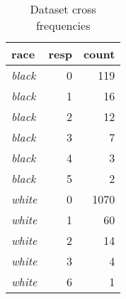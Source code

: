 \begin{table}[H]

\caption{\label{tab:dataset_crosscount}Dataset cross frequencies}
\centering
\begin{tabular}[t]{>{}l|r|r}
\hline
race & resp & count\\
\hline
\em{black} & 0 & 119\\
\hline
\em{black} & 1 & 16\\
\hline
\em{black} & 2 & 12\\
\hline
\em{black} & 3 & 7\\
\hline
\em{black} & 4 & 3\\
\hline
\em{black} & 5 & 2\\
\hline
\em{white} & 0 & 1070\\
\hline
\em{white} & 1 & 60\\
\hline
\em{white} & 2 & 14\\
\hline
\em{white} & 3 & 4\\
\hline
\em{white} & 6 & 1\\
\hline
\end{tabular}
\end{table}
